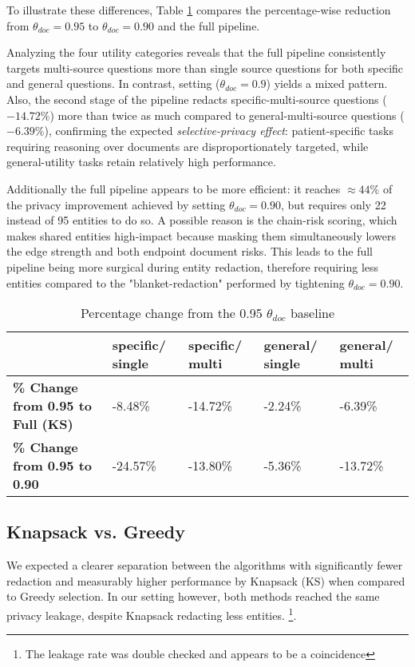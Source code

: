 To illustrate these differences, Table \ref{discussion-tab:percent-docOnly-Full} compares the percentage-wise reduction from $\theta_{doc} = 0.95$ to $\theta_{doc} = 0.90$ and the full pipeline. 

Analyzing the four utility categories reveals that the full pipeline consistently targets multi-source questions more than single source questions for both specific and general questions. In contrast, setting ($\theta_{doc} = 0.9$) yields a mixed pattern. Also, the second stage of the pipeline redacts specific-multi-source questions ($-14.72\%$) more than twice as much compared to general-multi-source questions ($-6.39\%$), confirming the expected \textit{selective-privacy effect}: patient-specific tasks requiring reasoning over documents are disproportionately targeted, while general-utility tasks retain relatively high performance.


Additionally the full pipeline appears to be more efficient: it reaches $\approx 44\%$ of the privacy improvement achieved by setting $\theta_{doc} = 0.90$, but requires only 22 instead of 95 entities to do so. A possible reason is the chain-risk scoring, which makes shared entities high-impact because masking them simultaneously lowers the edge strength and both endpoint document risks. This leads to the full pipeline being more surgical during entity redaction, therefore requiring less entities compared to the "blanket-redaction" performed by tightening $\theta_{doc} = 0.90$.

\begin{table}[h!]
\centering
\caption{Percentage change from the 0.95 $\theta_{doc}$ baseline}
\label{discussion-tab:percent-docOnly-Full}
\begin{tabular}{p{3.5cm} p{2cm} p{2cm} p{2cm} p{2cm}}
\toprule
\textbf{} & \textbf{specific/ single} & \textbf{specific/ multi} & \textbf{general/ single} & \textbf{general/ multi} \\
\midrule
\textbf{\% Change from 0.95 to Full (KS)} & -8.48\% & -14.72\% & -2.24\% & -6.39\% \\
\textbf{\% Change from 0.95 to 0.90} & -24.57\% & -13.80\% & -5.36\% & -13.72\% \\
\bottomrule
\end{tabular} 
\end{table}


\subsection{Knapsack vs. Greedy}%
We expected a clearer separation between the algorithms with significantly fewer redaction and measurably higher performance by Knapsack (KS) when compared to Greedy selection. In our setting however, both methods reached the same privacy leakage, despite Knapsack redacting less entities. \footnote{The leakage rate was double checked and appears to be a coincidence}. 

